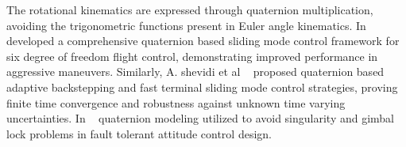 The rotational kinematics are expressed through quaternion multiplication, avoiding the trigonometric functions present in Euler angle kinematics. In ~\cite{yazdanshenas2024quaternion} developed a comprehensive quaternion based sliding mode control framework for six degree of freedom flight control, demonstrating improved performance in aggressive maneuvers. Similarly, A. shevidi et al ~\cite{shevidi2024quaternion} proposed quaternion based adaptive backstepping and fast terminal sliding mode control strategies, proving finite time convergence and robustness against unknown time varying uncertainties. In  ~\cite{sun2023attitude} quaternion modeling utilized  to avoid singularity and gimbal lock problems in fault tolerant attitude control design.












